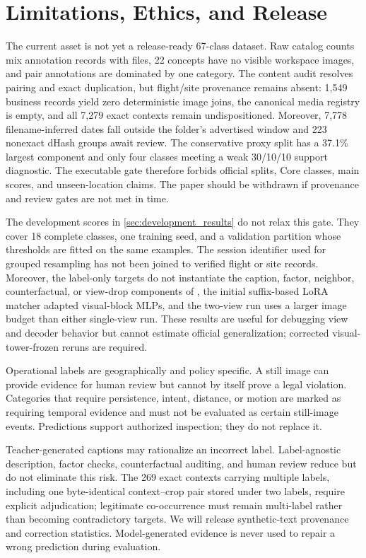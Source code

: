 \section{Limitations, Ethics, and Release}
\label{sec:limits}

The current asset is not yet a release-ready 67-class dataset. Raw catalog counts mix annotation records with files, 22 concepts have no visible workspace images, and pair annotations are dominated by one category. The content audit resolves pairing and exact duplication, but flight/site provenance remains absent: 1,549 business records yield zero deterministic image joins, the canonical media registry is empty, and all 7,279 exact contexts remain undispositioned. Moreover, 7,778 filename-inferred dates fall outside the folder's advertised window and 223 nonexact dHash groups await review. The conservative proxy split has a 37.1\% largest component and only four classes meeting a weak 30/10/10 support diagnostic. The executable gate therefore forbids official splits, Core classes, main scores, and unseen-location claims. The paper should be withdrawn if provenance and review gates are not met in time.

The development scores in \cref{sec:development_results} do not relax this gate. They cover 18 complete classes, one training seed, and a validation partition whose thresholds are fitted on the same examples. The session identifier used for grouped resampling has not been joined to verified flight or site records. Moreover, the label-only targets do not instantiate the caption, factor, neighbor, counterfactual, or view-drop components of \method, the initial suffix-based LoRA matcher adapted visual-block MLPs, and the two-view run uses a larger image budget than either single-view run. These results are useful for debugging view and decoder behavior but cannot estimate official generalization; corrected visual-tower-frozen reruns are required.

Operational labels are geographically and policy specific. A still image can provide evidence for human review but cannot by itself prove a legal violation. Categories that require persistence, intent, distance, or motion are marked as requiring temporal evidence and must not be evaluated as certain still-image events. Predictions support authorized inspection; they do not replace it.

Teacher-generated captions may rationalize an incorrect label. Label-agnostic description, factor checks, counterfactual auditing, and human review reduce but do not eliminate this risk. The 269 exact contexts carrying multiple labels, including one byte-identical context--crop pair stored under two labels, require explicit adjudication; legitimate co-occurrence must remain multi-label rather than becoming contradictory targets. We will release synthetic-text provenance and correction statistics. Model-generated evidence is never used to repair a wrong prediction during evaluation.

